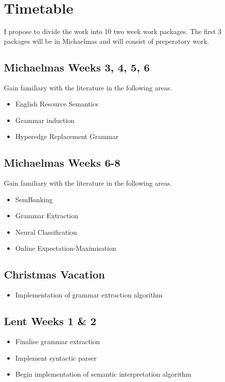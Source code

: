 \documentclass{article}
\begin{document}
\section{Timetable}

I propose to divide the work into 10 two week work packages. The first 3 packages will be in Michaelmas and will consist of preperatory work.

\subsection*{Michaelmas Weeks 3, 4, 5, 6}
Gain familiary with the literature in the following areas.
\begin{itemize}
    \item English Resource Semantics
    \item Grammar induction
    \item Hyperedge Replacement Grammar
\end{itemize}


\subsection*{Michaelmas Weeks 6-8}
Gain familiary with the literature in the following areas.
\begin{itemize}
    \item SemBanking
    \item Grammar Extraction
    \item Neural Classification
    \item Online Expectation-Maximisation
\end{itemize}

\subsection*{Christmas Vacation}
\begin{itemize}
    \item Implementation of grammar extraction algorithm
\end{itemize}

\subsection*{Lent Weeks 1 \& 2}
\begin{itemize}
    \item Finalise grammar extraction
    \item Implement syntactic parser
    \item Begin implementation of semantic interpretation algorithm
\end{itemize}
\end{document}
